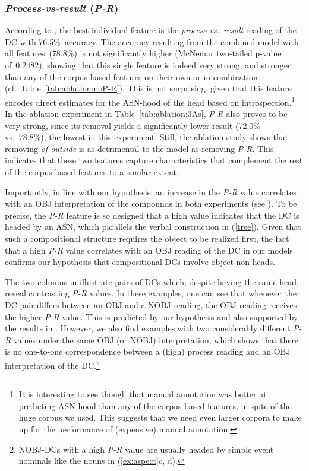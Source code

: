 \documentclass[output=paper]{langsci/langscibook}
\begin{document}
\subsubsection{\textit{Process-vs-result} (\textit{P-R})}\label{sec:gia:discussion-int-P-R}
According to , the best individual feature is the \textit{process vs.\ result} reading of the DC with 76.5\%~accuracy. 
The accuracy resulting from the combined model with all features~(78.8\%) is not significantly higher (McNemar two-tailed p-value of~0.2482), showing that this single feature is indeed very strong, and stronger than any of the corpus-based features on their own or in combination  {(cf.~Table~\ref{tab:ablation:noP-R})}. This is not surprising, given that this feature encodes direct estimates for the ASN-hood of the head based on introspection.\footnote{It is interesting to see though that manual annotation was better at predicting ASN-hood than any of the corpus-based features, in spite of the huge corpus we used. This suggests that we need even larger corpora to make up for the performance of (expensive) manual annotation.} In the ablation experiment  in Table~\ref{tab:ablation:3As}, \textit{P-R} also proves to be very strong, since its removal yields a significantly lower result ({72.0}\% vs.~78.8\%), the lowest  in this experiment. Still, the ablation study shows that removing \textit{of-outside} is as detrimental to the model as removing \textit{P-R}. This indicates that these two features capture characteristics that complement the rest of the corpus-based features to a similar extent.

Importantly, in line with our hypothesis, an increase in the \textit{P-R} value correlates with an OBJ interpretation of the compounds in both experiments (see  ).  To be precise, the \textit{P-R} feature is so designed that a high value indicates that the DC is headed by an ASN, which parallels  the verbal construction in (\ref{tree}). Given that such a compositional structure requires the object to be realized first, the fact that a high \textit{P-R} value correlates with an OBJ reading of the DC in our models confirms our hypothesis that compositional DCs involve object non-heads.

The two columns in  illustrate pairs of DCs which, despite having the same head, reveal contrasting \textit{P-R} values. In these examples, one can see that whenever the DC pair differs  {between an OBJ and a} NOBJ reading, the OBJ reading receives the higher \textit{P-R} value. This is predicted by our hypothesis and also supported by the results in .
However, we also find examples with two  {considerably} different \textit{P-R} values under the same OBJ (or NOBJ) interpretation, which shows that there is no one-to-one correspondence between a (high) process reading and an OBJ interpretation of the DC.\footnote{ {NOBJ-DCs with a high \textit{P-R} value are usually headed by simple event nominals like the nouns in (\ref{ex:aspect}c, d).}} 
\end{document}
